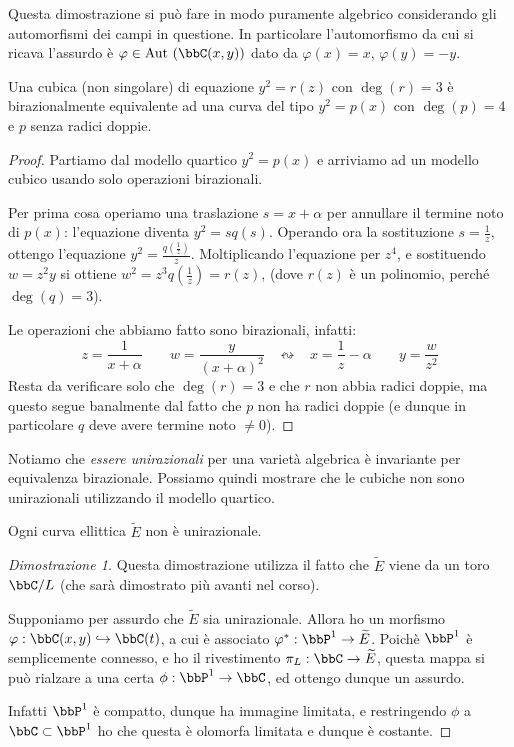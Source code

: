 \begin{osservazione}
Questa dimostrazione si può fare in modo puramente algebrico considerando gli automorfismi dei campi in questione. In particolare l'automorfismo da cui si ricava l'assurdo è $\varphi\in \Aut(\bbC(x,y))$ dato da $\varphi(x)=x$, $\varphi(y)=-y$.
\end{osservazione}
\begin{lemma}
Una cubica (non singolare) di equazione $y^2=r(z)$ con $\deg(r)=3$ è birazionalmente equivalente ad una curva del tipo $y^2=p(x)$ con $\deg(p)=4$ e $p$ senza radici doppie.
\end{lemma}
\begin{proof}
Partiamo dal modello quartico $y^2=p(x)$ e arriviamo ad un modello cubico usando solo operazioni birazionali.

Per prima cosa operiamo una traslazione $s=x+\alpha$ per annullare il termine noto di $p(x)$: l'equazione diventa $y^2=sq(s)$.
Operando ora la sostituzione $s=\frac{1}{z}$, ottengo l'equazione $y^2=\frac{q(\frac{1}{z})}{z}$. Moltiplicando l'equazione per $z^4$, e sostituendo $w=z^2y$ si ottiene $w^2=z^3q(\frac{1}{z})=r(z)$, (dove $r(z)$ è un polinomio, perché $\deg(q)=3$).

Le operazioni che abbiamo fatto sono birazionali, infatti:
$$z=\frac{1}{x+\alpha}  \;\;\;\;\;\;\;   w=\frac{y}{(x+\alpha)^2}  \;\;\;\leftrightsquigarrow\;\;\;  x=\frac{1}{z}-\alpha   \;\;\;\;\;\;\;  y=\frac{w}{z^2}$$
Resta da verificare solo che $\deg(r)=3$ e che $r$ non abbia radici doppie, ma questo segue banalmente dal fatto che $p$ non ha radici doppie (e dunque in particolare $q$ deve avere termine noto $\neq 0$).
\end{proof}

Notiamo che {\it essere unirazionali} per una varietà algebrica è invariante per equivalenza birazionale. Possiamo quindi mostrare che le cubiche non sono unirazionali utilizzando il modello quartico.

\begin{teorema}
Ogni curva ellittica $\widetilde{E}$ non è unirazionale.
\end{teorema}

\begin{proof}[Dimostrazione 1]
Questa dimostrazione utilizza il fatto che $\widetilde{E}$ viene da un toro $\bbC/L$ (che sarà dimostrato più avanti nel corso).

Supponiamo per assurdo che $\widetilde{E}$ sia unirazionale. Allora ho un morfismo $\varphi: \bbC(x,y)\hookrightarrow\bbC(t)$, a cui è associato $\varphi^*:\bbP^1\rightarrow\widetilde{E}$. Poichè $\bbP^1$ è semplicemente connesso, e ho il rivestimento $\pi_L:\bbC\rightarrow\widetilde{E}$, questa mappa si può rialzare a una certa $\phi:\bbP^1\rightarrow\bbC$, ed ottengo dunque un assurdo.

Infatti $\bbP^1$ è compatto, dunque ha immagine limitata, e restringendo $\phi$ a $\bbC\subset\bbP^1$ ho che questa è olomorfa limitata e dunque è costante.
\end{proof}

